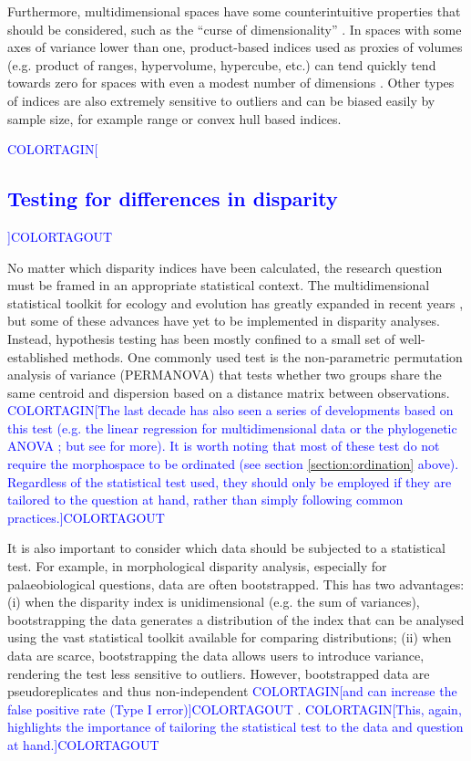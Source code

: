 \documentclass[12pt,letterpaper]{article}
\begin{document}
Furthermore, multidimensional spaces have some counterintuitive properties that should be considered, such as the ``curse of dimensionality'' \citep{Bellman1966}.
In spaces with some axes of variance lower than one, product-based indices used as proxies of volumes (e.g. product of ranges, hypervolume, hypercube, etc.) can tend quickly tend towards zero for spaces with even a modest number of dimensions \citep{Bellman1966}.
Other types of indices are also extremely sensitive to outliers and can be biased easily by sample size, for example range \citep{Wills2001} or convex hull based \citep{Jackson2011} indices.

\textcolor{blue}{COLORTAGIN[\subsection{Testing for differences in disparity} ]COLORTAGOUT\label{section:testing}}

No matter which disparity indices have been calculated, the research question must be framed in an appropriate statistical context.
The multidimensional statistical toolkit for ecology and evolution has greatly expanded in recent years \citep{clavel2015mvmorph, Adams2018}, but some of these advances have yet to be implemented in disparity analyses.
Instead, hypothesis testing has been mostly confined to a small set of well-established methods.
One commonly used test is the non-parametric permutation analysis of variance (PERMANOVA) \citep{Anderson2001} that tests whether two groups share the same centroid and dispersion based on a distance matrix between observations.
\textcolor{blue}{COLORTAGIN[The last decade has also seen a series of developments based on this test (e.g. the linear regression for multidimensional data \citealt{collyer2015method} or the phylogenetic ANOVA \citealt{adams2014}; but see \citealt{Adams2018,lloyd2016} for more).
It is worth noting that most of these test do not require the morphospace to be ordinated (see section \ref{section:ordination} above).
Regardless of the statistical test used, they should only be employed if they are tailored to the question at hand, rather than simply following common practices.]COLORTAGOUT}

It is also important to consider which data should be subjected to a statistical test.
For example, in morphological disparity analysis, especially for palaeobiological questions, data are often bootstrapped.
This has two advantages: (i) when the disparity index is unidimensional (e.g. the sum of variances), bootstrapping the data generates a distribution of the index that can be analysed using the vast statistical toolkit available for comparing distributions; (ii) when data are scarce, bootstrapping the data allows users to introduce variance, rendering the test less sensitive to outliers.
However, bootstrapped data are pseudoreplicates and thus non-independent \textcolor{blue}{COLORTAGIN[and can increase the false positive rate (Type I error)]COLORTAGOUT} \citep{strube1988bootstrap}.
\textcolor{blue}{COLORTAGIN[This, again, highlights the importance of tailoring the statistical test to the data and question at hand.]COLORTAGOUT}
\end{document}
